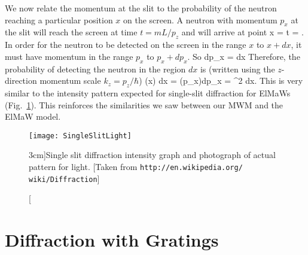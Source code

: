 \eeq
\begin{marginfigure}[-2cm]
\end{marginfigure}

We now relate the momentum at the slit to the probability of the neutron reaching a particular position $x$ on the screen. A neutron with momentum $p_x$ at the slit will reach the screen at time $t=m L/p_z$ and will arrive at point
\beq
x =  t = .
\eeq
In order for the neutron to be detected on the screen in the range $x$ to $x+dx$, it must have momentum in the range $p_x$ to $p_x + dp_x$. So
\beq
dp_x =  dx
\eeq
Therefore, the probability of detecting the neutron in the region $dx$ is (written using the $z$-direction momentum scale $k_z = p_z/\hbar$)\beq
\Pd(x) dx = \Pd(p_x)dp_x =  ^2 dx.
\eeq
 This is very similar to the intensity pattern expected for single-slit diffraction for ElMaWs (Fig.~\ref{single slit light}). This reinforces the similarities we saw between our MWM and the ElMaW model. 
\begin{figure}
\begin{center}
\texttt{[image: SingleSlitLight]}
\caption[][3cm]{Single slit diffraction intensity graph and photograph of actual pattern for light. [Taken from {\tt http://en.wikipedia.org/ wiki/Diffraction}] }
\label{single slit light}
\end{center}
\end{figure}
%

\section{Diffraction with Gratings}

